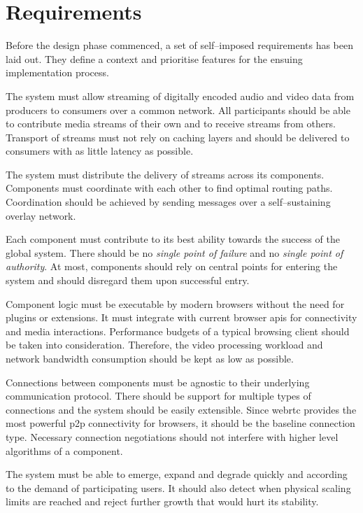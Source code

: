 \section{Requirements}\label{sec:requirements}

Before the design phase commenced, a set of self–imposed requirements has been laid out. They define a context and prioritise features for the ensuing implementation process.

\begin{enumerate}
The system must allow streaming of digitally encoded audio and video data from producers to consumers over a common network. All participants should be able to contribute media streams of their own and to receive streams from others. Transport of streams must not rely on caching layers and should be delivered to consumers with as little latency as possible.

The system must distribute the delivery of streams across its components. Components must coordinate with each other to find optimal routing paths. Coordination should be achieved by sending messages over a self–sustaining overlay network.

Each component must contribute to its best ability towards the success of the global system. There should be no \textit{single point of failure} and no \textit{single point of authority}. At most, components should rely on central points for entering the system and should disregard them upon successful entry.

Component logic must be executable by modern browsers without the need for plugins or extensions. It must integrate with current browser \glspl{api} for connectivity and media interactions. Performance budgets of a typical browsing client should be taken into consideration. Therefore, the video processing workload and network bandwidth consumption should be kept as low as possible.

Connections between components must be agnostic to their underlying communication protocol. There should be support for multiple types of connections and the system should be easily extensible. Since \gls{webrtc} provides the most powerful \gls{p2p} connectivity for browsers, it should be the baseline connection type. Necessary connection negotiations should not interfere with higher level algorithms of a component.

The system must be able to emerge, expand and degrade quickly and according to the demand of participating users. It should also detect when physical scaling limits are reached and reject further growth that would hurt its stability.


\end{enumerate}
